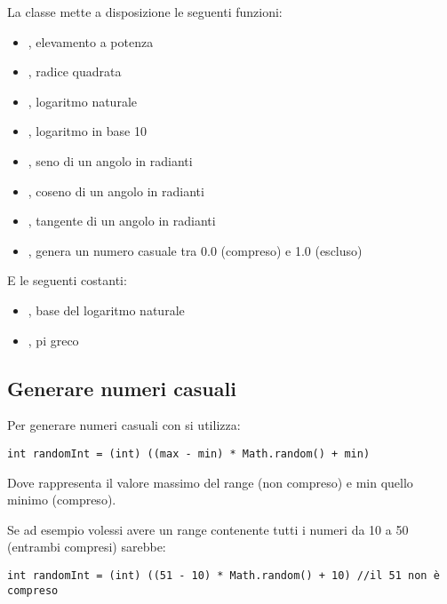 \documentclass[../main.tex]{subfiles}
\begin{document}
La classe  mette a disposizione le seguenti funzioni:
\begin{itemize}
    \item {}, elevamento a potenza
    \item {}, radice quadrata
    \item {}, logaritmo naturale
    \item {}, logaritmo in base 10
    \item {}, seno di un angolo in radianti
    \item {}, coseno di un angolo in radianti
    \item {}, tangente di un angolo in radianti
    \item {}, genera un numero casuale tra 0.0 (compreso) e 1.0 (escluso)
\end{itemize}

E le seguenti costanti:
\begin{itemize}
    \item {}, base del logaritmo naturale
    \item {}, pi greco
\end{itemize}

\subsection{Generare numeri casuali}
Per generare numeri casuali con  si utilizza:
\begin{lstlisting}[style=java]
    int randomInt = (int) ((max - min) * Math.random() + min)
\end{lstlisting}
Dove  rappresenta il valore massimo del range (non compreso) e min quello minimo (compreso).

Se ad esempio volessi avere un range contenente tutti i numeri da 10 a 50 (entrambi compresi) sarebbe:
\begin{lstlisting}[style=java]
    int randomInt = (int) ((51 - 10) * Math.random() + 10) //il 51 non è compreso
\end{lstlisting}
\end{document}
